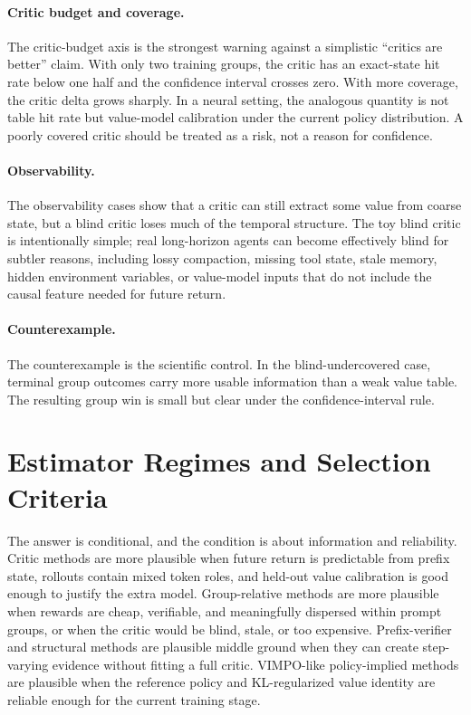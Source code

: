 \documentclass[11pt]{article}
\newcommand{\vimpo}{\textsc{VIMPO}}
\begin{document}
\paragraph{Critic budget and coverage.}
The critic-budget axis is the strongest warning against a simplistic ``critics
are better'' claim. With only two training groups, the critic has an exact-state
hit rate below one half and the confidence interval crosses zero. With more
coverage, the critic delta grows sharply. In a neural setting, the analogous
quantity is not table hit rate but value-model calibration under the current
policy distribution. A poorly covered critic should be treated as a risk, not a
reason for confidence.

\paragraph{Observability.}
The observability cases show that a critic can still extract some value from
coarse state, but a blind critic loses much of the temporal structure. The toy
blind critic is intentionally simple; real long-horizon agents can become
effectively blind for subtler reasons, including lossy compaction, missing tool
state, stale memory, hidden environment variables, or value-model inputs that do
not include the causal feature needed for future return.

\paragraph{Counterexample.}
The counterexample is the scientific control. In the blind-undercovered case,
terminal group outcomes carry more
usable information than a weak value table. The resulting group win is small but
clear under the confidence-interval rule.

\section{Estimator Regimes and Selection Criteria}

The answer is conditional, and the condition is about information and
reliability. Critic methods are more plausible when future return is predictable
from prefix state, rollouts contain mixed token roles, and held-out value
calibration is good enough to justify the extra model. Group-relative methods
are more plausible when rewards are cheap, verifiable, and meaningfully
dispersed within prompt groups, or when the critic would be blind, stale, or too
expensive. Prefix-verifier and structural methods are plausible middle ground
when they can create step-varying evidence without fitting a full critic.
\vimpo-like policy-implied methods are plausible when the reference policy and
KL-regularized value identity are reliable enough for the current training
stage.
\end{document}
